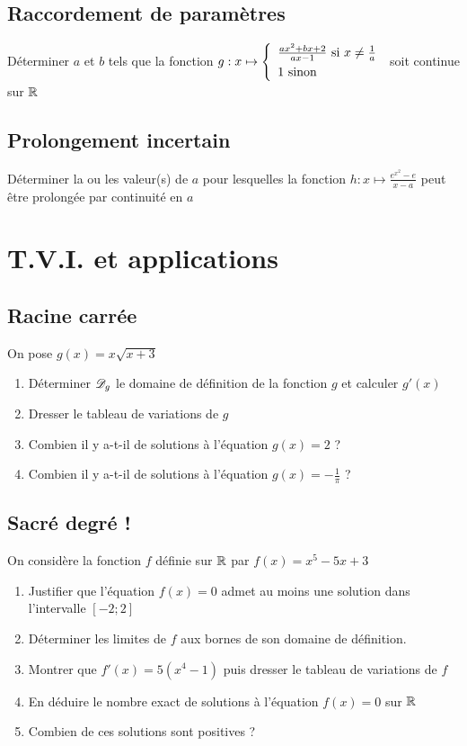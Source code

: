 \documentclass[oneside,12pt]{book}          %
\begin{document}
\subsection{Raccordement de paramètres}
Déterminer $a$ et $b$ tels que la fonction $g:x\mapsto\accolsized{\frac{ax^2+bx+2}{ax-1} \text{ si } x\neq\frac{1}{a} \\ 1 \text{ sinon}}{1.3}$ soit continue sur ${\mathbb R}$



\subsection{Prolongement incertain}
Déterminer la ou les valeur(s) de $a$ pour lesquelles la fonction $h:x\mapsto\frac{e^{x^2}-e}{x-a}$ peut être prolongée par continuité en $a$




\section{T.V.I. et applications}

\subsection{Racine carrée}
On pose $g(x)=x\sqrt{x+3}$
\begin{enumerate}
    \item Déterminer ${\mathscr{D}}_g$ le domaine de définition de la fonction $g$ et calculer $g'(x)$
    \item Dresser le tableau de variations de $g$
    \item Combien il y a-t-il de solutions à l'équation $g(x)=2$ ?
    \item Combien il y a-t-il de solutions à l'équation $g(x)=-\frac{1}{\pi}$ ?
\end{enumerate}



\subsection{Sacré degré !}
On considère la fonction $f$ définie sur ${\mathbb R}$ par $f(x)=x^5-5x+3$
\begin{enumerate}
    \item Justifier que l'équation $f(x)=0$ admet au moins une solution dans l'intervalle $[-2;2]$
    \item Déterminer les limites de $f$ aux bornes de son domaine de définition.
    \item Montrer que $f'(x)=5(x^4-1)$ puis dresser le tableau de variations de $f$
    \item En déduire le nombre exact de solutions à l'équation $f(x)=0$ sur ${\mathbb R}$
    \item Combien de ces solutions sont positives ?
\end{enumerate}
\end{document}
